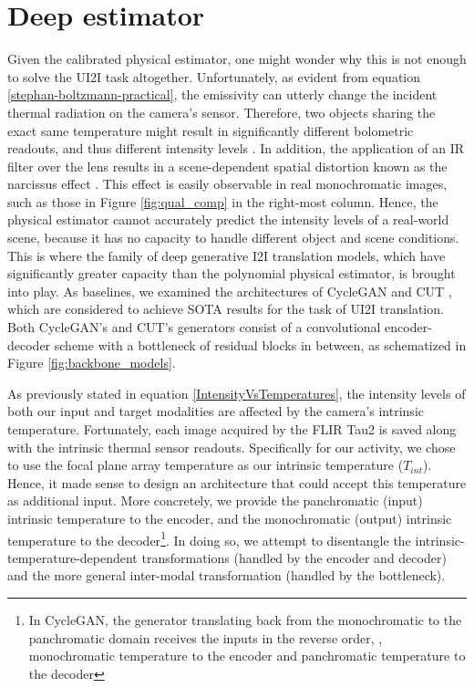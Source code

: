 \section{Deep estimator}
Given the calibrated physical estimator, one might wonder why this is not enough to solve the UI2I task altogether. 
Unfortunately, as evident from equation \ref{stephan-boltzmann-practical}, the emissivity can utterly change the incident thermal radiation on the camera's sensor. 
Therefore, two objects sharing the exact same temperature might result in significantly different bolometric readouts, and thus different intensity levels \cite{holman1989heat}.
In addition, the application of an IR filter over the lens results in a scene-dependent spatial distortion known as the narcissus effect \cite{FundamentalsOfInfraredThermalImaging}.
This effect is easily observable in real monochromatic images, such as those in Figure \ref{fig:qual_comp} in the right-most column.
Hence, the physical estimator cannot accurately predict the intensity levels of a real-world scene, because it has no capacity to handle different object and scene conditions.
This is where the family of deep generative I2I translation models, which have significantly greater capacity than the polynomial physical estimator, is brought into play.
As baselines, we examined the architectures of CycleGAN \cite{CycleGAN2017} and CUT \cite{park2020cut}, which are considered to achieve SOTA results for the task of UI2I translation.
Both CycleGAN's and CUT's generators consist of a convolutional encoder-decoder scheme with a bottleneck of residual blocks \cite{He2016DeepRL} in between, as schematized in Figure \ref{fig:backbone_models}.

As previously stated in equation \ref{IntensityVsTemperatures}, the intensity levels of both our input and target modalities are affected by the camera's intrinsic temperature.
Fortunately, each image acquired by the FLIR Tau2 is saved along with the intrinsic thermal sensor readouts.
Specifically for our activity, we chose to use the focal plane array temperature as our intrinsic temperature ($T_\mathit{int}$).
Hence, it made sense to design an architecture that could accept this temperature as additional input.
More concretely, we provide the panchromatic (input) intrinsic temperature to the encoder, and the monochromatic (output) intrinsic temperature to the decoder\footnote{In CycleGAN, the generator translating back from the monochromatic to the panchromatic domain receives the inputs in the reverse order, \ie, monochromatic temperature to the encoder and panchromatic temperature to the decoder}.
In doing so, we attempt to disentangle the intrinsic-temperature-dependent transformations (handled by the encoder and decoder) and the more general inter-modal transformation (handled by the bottleneck).

